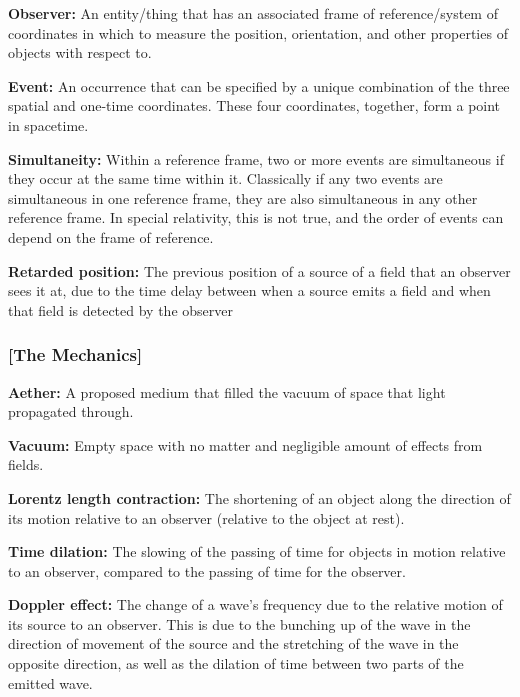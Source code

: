 \noindent \hypertarget{def-observer}{\textbf{Observer:}}
An entity/thing that has an associated frame of reference/system of coordinates in which to measure the position, orientation, and other properties of objects with respect to.

\noindent \hypertarget{def-event}{\textbf{Event:}}
An occurrence that can be specified by a unique combination of the three spatial and one-time coordinates. These four coordinates, together, form a point in spacetime.

\noindent \hypertarget{def-simultaneity}{\textbf{Simultaneity:}}
Within a reference frame, two or more events are simultaneous if they occur at the same time within it. Classically if any two events are simultaneous in one reference frame, they are also simultaneous in any other reference frame. In special relativity, this is not true, and the order of events can depend on the frame of reference.

\noindent \hypertarget{def-retarded-position}{\textbf{Retarded position:}}
The previous position of a source of a field that an observer sees it at, due to the time delay between when a source emits a field and when that field is detected by the observer


\subsubsection{[The Mechanics]}%

\noindent \hypertarget{def-aether}{\textbf{Aether:}}
A proposed medium that filled the vacuum of space that light propagated through.

\noindent \hypertarget{def-vacuum}{\textbf{Vacuum:}}
Empty space with no matter and negligible amount of effects from fields.

\noindent \hypertarget{def-length-contraction}{\textbf{Lorentz length contraction:}}
The shortening of an object along the direction of its motion relative to an observer (relative to the object at rest).

\noindent \hypertarget{def-time-dilation}{\textbf{Time dilation:}}
The slowing of the passing of time for objects in motion relative to an observer, compared to the passing of time for the observer.

\noindent \hypertarget{def-doppler-effect}{\textbf{Doppler effect:}}
The change of a wave's frequency due to the relative motion of its source to an observer. This is due to the bunching up of the wave in the direction of movement of the source and the stretching of the wave in the opposite direction, as well as the dilation of time between two parts of the emitted wave.

